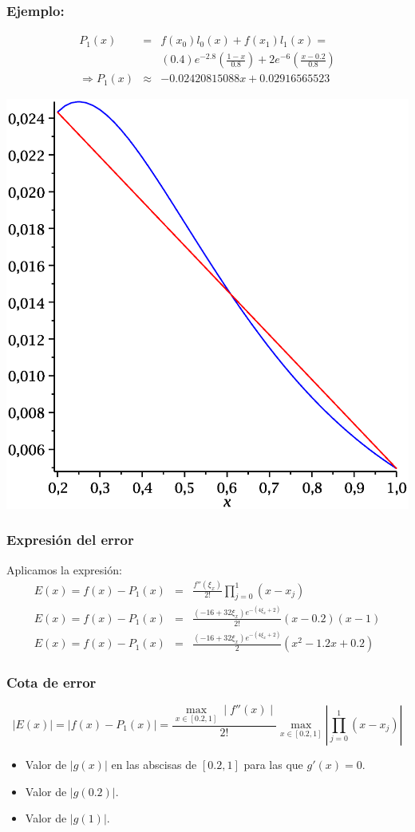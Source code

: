 \documentclass[10pt]{beamer}
\begin{document}
\frame
{
\frametitle{Ejemplo:}
\begin{eqnarray}
 P_1(x) & =& f(x_0)l_0(x) + f(x_1)l_1(x) = \nonumber\\
& &(0.4)e^{-2.8}\left(\frac{1-x}{0.8}\right) + 2e^{-6}\left(\frac{x-0.2}{0.8}\right)\nonumber\\
\Rightarrow P_1(x) &\approx& -0.02420815088x +0.02916565523\nonumber
\end{eqnarray}
\begin{center}
\includegraphics[scale=0.23]{approx.eps}
\end{center}
}
\frame
{
\frametitle{Expresi\'on del error}
Aplicamos la expresi\'on:
\begin{eqnarray}
 E(x)  =  f(x) - P_1(x) & = & \frac{f''(\xi_x)}{2!}\prod_{j=0}^1(x-x_j)\nonumber\\
E(x)  =  f(x) - P_1(x) & = & \frac{(-16+32\xi_x)e^{-(4\xi_x+2)}}{2!}(x-0.2)(x-1)\nonumber\\
E(x)  =  f(x) - P_1(x) & = & \frac{(-16+32\xi_x)e^{-(4\xi_x+2)}}{2}(x^2-1.2x+0.2)\nonumber
\end{eqnarray}
}
\frame
{
\frametitle{Cota de error}
$$
\mid E(x)\mid  =  \mid f(x) - P_1(x)\mid  =  \frac{\displaystyle\max_{x\in[0.2,1]}\mid f''(x)\mid}{2!}\displaystyle\max_{x\in[0.2,1]}\left|\prod_{j=0}^1(x-x_j)\right|
$$
\begin{itemize}
 \item<4-> Valor de $|g(x)|$ en las abscisas de $[0.2, 1]$ para las que $g'(x) = 0$.
 \item<5-> Valor de $|g(0.2)|$.
 \item<6-> Valor de $|g(1)|$.
\end{itemize}
}
\end{document}
